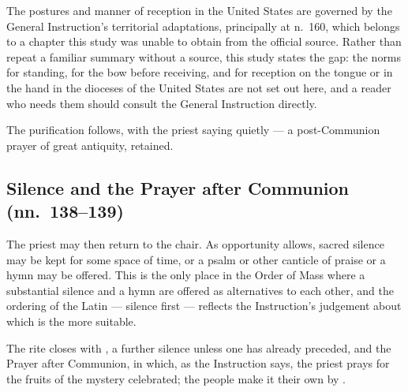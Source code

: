 The postures and manner of reception in the United States are governed by the General
Instruction's territorial adaptations, principally at n.\ 160, which belongs to a chapter this
study was unable to obtain from the official source. Rather than repeat a familiar summary
without a source, this study states the gap: the norms for standing, for the bow before
receiving, and for reception on the tongue or in the hand in the dioceses of the United States
are not set out here, and a reader who needs them should consult the General Instruction
directly.

The purification follows, with the priest saying quietly  --- a post-Communion
prayer of great antiquity, retained.

\subsection{Silence and the Prayer after Communion (nn.\ 138--139)}

The priest may then return to the chair. As opportunity allows, sacred silence may be kept for
some space of time, or a psalm or other canticle of praise or a hymn may be
offered. This is the only place in the Order
of Mass where a substantial silence and a hymn are offered as alternatives to each other, and
the ordering of the Latin --- silence first --- reflects the Instruction's judgement about
which is the more suitable.

The rite closes with , a further silence unless one has already preceded, and the
Prayer after Communion, in which, as the Instruction says, the priest prays for the fruits of
the mystery celebrated; the people make it their own by .
